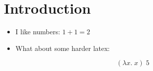 \documentclass{article}
\begin{document}
\section{Introduction}

\begin{itemize}

\item I like numbers: $1 + 1 = 2$

\item What about some harder latex:

$$
(\lambda x. \; x) \; 5
$$

\end{itemize}
\end{document}
